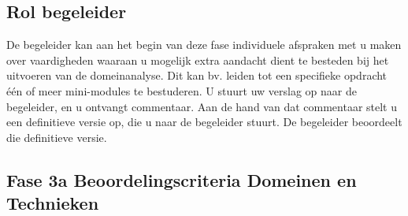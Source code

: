 \subsection{Rol begeleider}

De begeleider kan aan het begin van deze fase individuele afspraken met u maken
over vaardigheden waaraan u mogelijk extra aandacht dient te besteden bij het
uitvoeren van de domeinanalyse. Dit kan bv. leiden tot een specifieke opdracht
één of meer mini-modules te bestuderen.
U stuurt uw verslag op naar de begeleider, en u ontvangt commentaar.
Aan de hand van dat commentaar stelt u een definitieve versie op, die u naar de
begeleider stuurt. De begeleider beoordeelt die definitieve versie.

\subsection{Fase 3a Beoordelingscriteria Domeinen en Technieken}
\vspace{1em}
